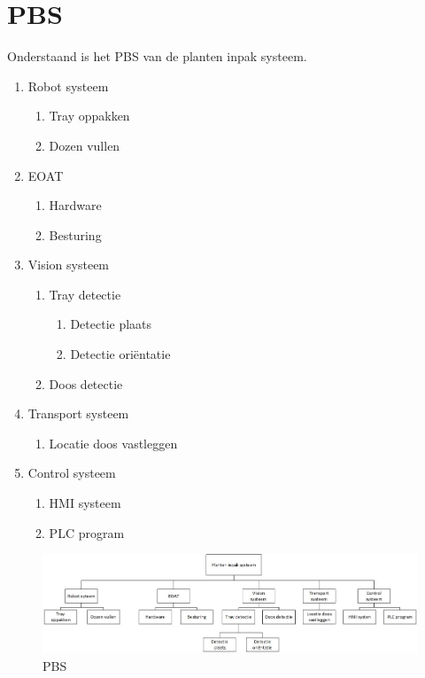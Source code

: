 \section*{PBS}

Onderstaand is het PBS van de planten inpak systeem.

\begin{enumerate}[label*=\arabic*.]
	\item Robot systeem
	\begin{enumerate}[label*=\arabic*.]
		\item Tray oppakken
		\item Dozen vullen
	\end{enumerate}
	\item EOAT
	\begin{enumerate}[label*=\arabic*.]
		\item Hardware
		\item Besturing
	\end{enumerate}
	\item Vision systeem
	\begin{enumerate}[label*=\arabic*.]
		\item Tray detectie
		\begin{enumerate}[label*=\arabic*.]
			\item Detectie plaats
			\item Detectie oriëntatie
		\end{enumerate}
		\item Doos detectie
	\end{enumerate}
	\item Transport systeem
	\begin{enumerate}[label*=\arabic*.]
		\item Locatie doos vastleggen
	\end{enumerate}
	\item Control systeem
	\begin{enumerate}[label*=\arabic*.]
		\item HMI systeem
		\item PLC program
	\end{enumerate}
\end{enumerate}

\begin{figure}[h]
	\begin{center}
		\includegraphics[width=\textwidth]{Afbeeldingen/PBS.jpg}
		\caption{PBS} 
	\end{center}
\end{figure}
